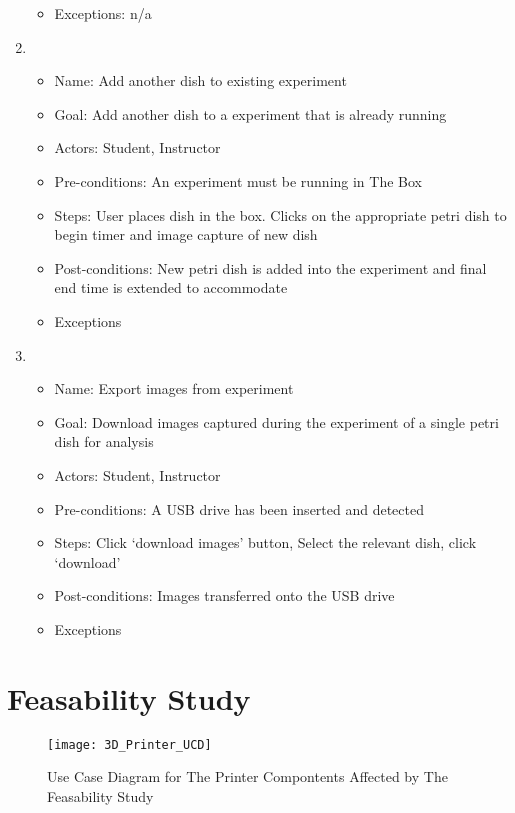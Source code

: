 \begin{enumerate}
\begin{itemize}
		\item Exceptions: n/a
	\end{itemize}
	\item 
	\begin{itemize}
		\item Name: Add another dish to existing experiment
		\item Goal: Add another dish to a experiment that is already running 
		\item Actors:  Student, Instructor
		\item Pre-conditions: An experiment must be running in The Box
		\item Steps: User places dish in the box. Clicks on the appropriate petri dish to begin timer and image capture of new dish
		\item Post-conditions: New petri dish is added into the experiment and final end time is extended to accommodate 
		\item Exceptions
	\end{itemize}
	\item 
	\begin{itemize}
		\item Name: Export images from experiment
		\item Goal: Download images captured during the experiment of a single petri dish for analysis
		\item Actors:  Student, Instructor
		\item Pre-conditions: A USB drive has been inserted and detected
		\item Steps: Click `download images' button, Select the relevant dish, click `download'
		\item Post-conditions: Images transferred onto the USB drive
		\item Exceptions
	\end{itemize}
\end{enumerate}

\section{Feasability Study}

\begin{figure}[H]
\caption{\label{figure:3D_Printer_UCD} Use Case Diagram for The Printer Compontents Affected by The Feasability Study}
\texttt{[image: 3D\_Printer\_UCD]}
\end{figure}

